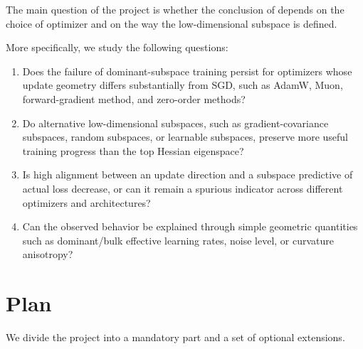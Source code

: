 \documentclass[conference]{IEEEtran}
\begin{document}
The main question of the project is whether the conclusion of \citet{SongDoesSGD} depends on the choice of optimizer and on the way the low-dimensional subspace is defined.

More specifically, we study the following questions:

\begin{enumerate}
    \item Does the failure of dominant-subspace training persist for optimizers whose update geometry differs substantially from SGD, such as AdamW, Muon, forward-gradient method, and zero-order methods?
    
    \item Do alternative low-dimensional subspaces, such as gradient-covariance subspaces, random subspaces, or learnable subspaces, preserve more useful training progress than the top Hessian eigenspace?
    
    \item Is high alignment between an update direction and a subspace predictive of actual loss decrease, or can it remain a spurious indicator across different optimizers and architectures?
    
    \item Can the observed behavior be explained through simple geometric quantities such as dominant/bulk effective learning rates, noise level, or curvature anisotropy?
\end{enumerate}


\section{Plan}
We divide the project into a mandatory part and a set of optional extensions.
\end{document}
